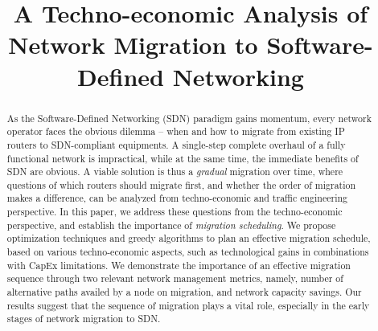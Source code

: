\documentclass[conference]{IEEEtran}
\begin{document}
\title{A Techno-economic Analysis of Network Migration to Software-Defined Networking}

\author{
\and
{}
}

\maketitle

\begin{abstract}
As the Software-Defined Networking (SDN) paradigm gains momentum, every network
operator faces the obvious dilemma -- when and how to migrate from existing IP
routers to SDN-compliant equipments. A single-step
complete overhaul of a fully functional network is impractical, while at the
same time, the immediate benefits of SDN are obvious. A viable solution is thus
a \emph{gradual} migration over time, where questions of which routers should
migrate first, and whether the order of migration makes a difference, can be
analyzed from techno-economic and traffic engineering perspective. In this
paper, we address these questions from the techno-economic perspective, and
establish the importance of \emph{migration scheduling}. We propose optimization
techniques and greedy algorithms to plan an effective migration schedule, based
on various techno-economic aspects, such as technological gains in combinations
with CapEx limitations. We demonstrate the importance of an effective migration
sequence through two relevant network management metrics, namely, number of
alternative paths availed by a node on migration, and network capacity savings.
Our results suggest that the sequence
of migration plays a vital role, especially in
the early stages of network migration to SDN.
\end{abstract}
\end{document}
